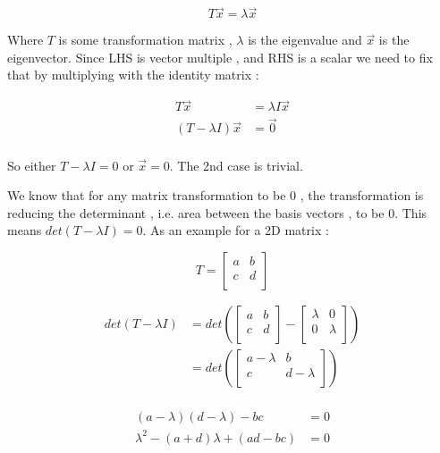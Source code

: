\[
	T \vec{x} = \lambda \vec{x}
\]

Where \( T \) is some transformation matrix , \( \lambda \) is the eigenvalue and \( \vec{x} \) is the eigenvector. Since LHS is vector multiple , and RHS is a scalar we need to fix that by multiplying with the identity matrix :

\[
\begin{aligned}
	T \vec{x} & = \lambda I \vec{x} \\
	(T - \lambda I) \vec{x} & = \vec{0}\\
\end{aligned}
\]

So either \( T - \lambda I = 0 \) or \( \vec{x} = 0 \). The 2nd case is trivial.

We know that for any matrix transformation to be \( 0 \) , the transformation is reducing the determinant , i.e. area between the basis vectors , to be \( 0 \). This means \( det(T - \lambda I ) = 0 \). As an example for a 2D matrix :

\[
T = 
	\left[{
		\begin{array}{cc}
			a & b \\
			c & d \\
		\end{array}
	} \right]
\]

\[
\begin{aligned}
	det(T - \lambda I ) & = det \left(
	\left[{
		\begin{array}{cc}
			a & b \\
			c & d \\
		\end{array}
	} \right]
	-
	\left[{
		\begin{array}{cc}
			\lambda & 0 \\
			0 & \lambda \\
		\end{array}
	} \right]
	\right)
	\\
	& = det \left(
	\left[{
		\begin{array}{cc}
			a - \lambda & b \\
			c & d - \lambda \\
		\end{array}
	} \right]
	\right)
	\\
\end{aligned}
\]

\[
\begin{aligned}
	(a - \lambda)( d - \lambda) - bc & = 0 \\
	{\lambda}^{2} - (a+d)\lambda + (ad-bc) & = 0 \\
\end{aligned}
\]

